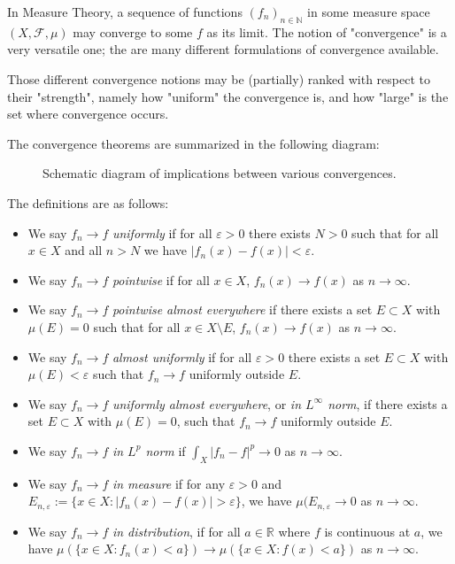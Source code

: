 
In Measure Theory, a sequence of functions $(f_n)_{n \in \mathbb{N}}$ in some measure space $(X, \mathcal{F}, \mu)$ may converge to some $f$ as its limit. The notion of "convergence" is a very versatile one; the are many different formulations of convergence available. 

Those different convergence notions may be (partially) ranked with respect to their "strength", namely how "uniform" the convergence is, and how "large" is the set where convergence occurs.

The convergence theorems are summarized in the following diagram:

\begin{figure}[ht]
    \centering
    \caption{Schematic diagram of implications between various convergences.}
    \label{fig:convergence-theorems}
\end{figure}

The definitions are as follows:

\begin{itemize}
	\item [Uniform] We say $f_n \to f$ \textit{uniformly} if for all $\varepsilon>0$ there exists $N>0$ such that for all $x \in X$ and all $n > N $ we have $|f_n(x) - f(x)| < \varepsilon$.
	\item [PW] We say $f_n \to f$ \textit{pointwise} if for all  $x \in X$, $f_n(x) \to f(x)$ as $n \to \infty $.
	\item [AE] We say $f_n \to f$ \textit{pointwise almost everywhere} if there exists a set $E \subset X$ with $\mu(E) = 0$ such that for all $x \in X \setminus E$, $f_n(x) \to f(x)$ as $n \to \infty $.
	\item [AU] We say $f_n \to f$ \textit{almost uniformly} if for all $\varepsilon>0$ there exists a set  $E \subset X$ with $\mu(E) < \varepsilon$ such that $f_n \to f$ uniformly outside $E$.
	\item [$L^\infty $ ] We say $f_n \to f$ \textit{uniformly almost everywhere}, or \textit{in $L^\infty $ norm}, if there exists a set $E \subset X$ with $\mu(E) = 0$, such that $f_n \to f$ uniformly outside $E$.
	\item [$L^p$ ] We say $f_n \to f$ \textit{in $L^p$ norm} if $\int_X |f_n - f|^p \to 0$ as $n \to  \infty $.
	\item [M] We say $f_n \to f$ \textit{in measure} if for any $\varepsilon>0$ and $E_{n, \varepsilon}:= \{x \in X: |f_n(x) - f(x)| > \varepsilon\} $, we have $\mu(E_{n, \varepsilon} \to 0$ as $n \to \infty $.
	\item [dist] We say $f_n \to f$ \textit{in distribution}, if for all $a \in \mathbb{R}$ where $f $ is continuous at $a$, we have $\mu\left( \{x \in X: f_n(x) < a\}  \right) \to  \mu\left( \{x \in X: f(x) < a\}  \right) $ as $n \to \infty $.
\end{itemize}


